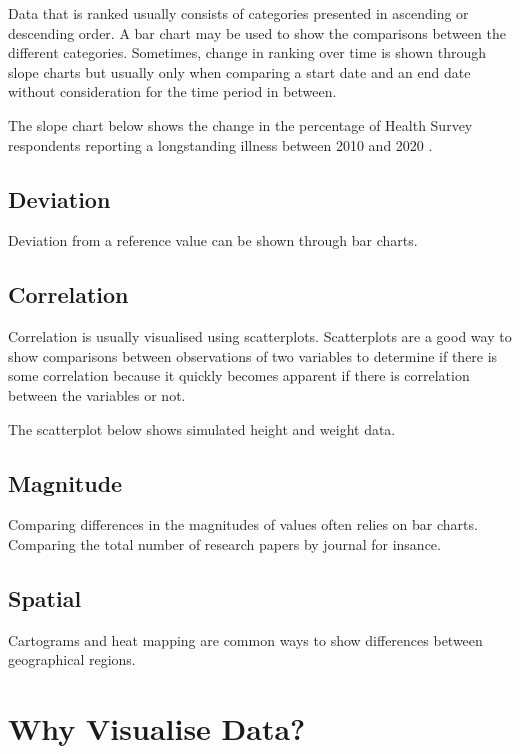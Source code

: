 \documentclass[
]{book}
\begin{document}
Data that is ranked usually consists of categories presented in ascending or descending order. A bar chart may be used to show the comparisons between the different categories. Sometimes, change in ranking over time is shown through slope charts but usually only when comparing a start date and an end date without consideration for the time period in between.

The slope chart below shows the change in the percentage of Health Survey respondents reporting a longstanding illness between 2010 and 2020 \citep{health}.

\hypertarget{deviation}{%
\subsection{Deviation}\label{deviation}}

Deviation from a reference value can be shown through bar charts.

\hypertarget{correlation}{%
\subsection{Correlation}\label{correlation}}

Correlation is usually visualised using scatterplots. Scatterplots are a good way to show comparisons between observations of two variables to determine if there is some correlation because it quickly becomes apparent if there is correlation between the variables or not.

The scatterplot below shows simulated height and weight data.

\hypertarget{magnitude}{%
\subsection{Magnitude}\label{magnitude}}

Comparing differences in the magnitudes of values often relies on bar charts. Comparing the total number of research papers by journal for insance.

\hypertarget{spatial}{%
\subsection{Spatial}\label{spatial}}

Cartograms and heat mapping are common ways to show differences between geographical regions.

\hypertarget{why-visualise-data}{%
\section{Why Visualise Data?}\label{why-visualise-data}}
\end{document}
